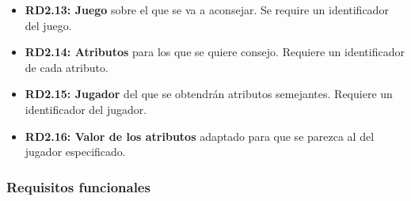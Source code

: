 \begin{itemize}
		\item \textbf{RD2.13: Juego} sobre el que se va a aconsejar.
			Se require un identificador del juego.

		\item \textbf{RD2.14: Atributos} para los que se quiere consejo.
			Requiere un identificador de cada atributo.

		\item \textbf{RD2.15: Jugador} del que se obtendrán atributos semejantes.
			Requiere un identificador del jugador.

		\item \textbf{RD2.16: Valor de los atributos} adaptado para que se parezca
		 	al del jugador especificado.
	\end{itemize}


\subsubsection{Requisitos funcionales}

